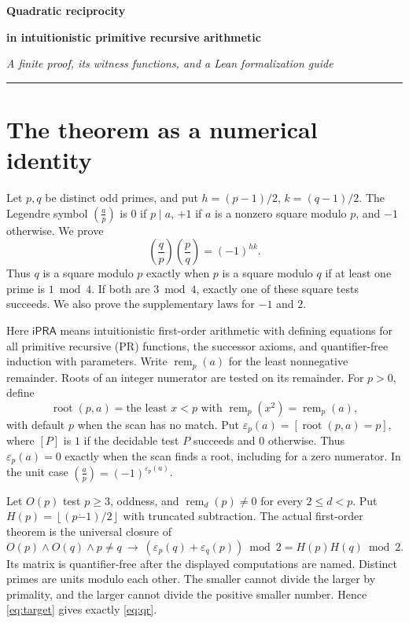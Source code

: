 \documentclass[12pt,letterpaper]{article}
\newcommand{\sect}[1]{\section{\texorpdfstring{\color{accent}#1}{#1}}}
\newcommand{\leg}[2]{\left(\frac{#1}{#2}\right)}
\newcommand{\floor}[1]{\left\lfloor#1\right\rfloor}
\newcommand{\remn}{\operatorname{rem}}
\newcommand{\rootf}{\operatorname{root}}
\newcommand{\sgnbit}{\varepsilon}
\newcommand{\ipra}{\mathsf{iPRA}}
\begin{document}
\thispagestyle{plain}
{\Huge\bfseries\sffamily\color{accent}Quadratic reciprocity}\par
{\LARGE\bfseries in intuitionistic primitive recursive arithmetic}\par
\vspace{3pt}
\textit{A finite proof, its witness functions, and a Lean formalization guide}
\par\vspace{3pt}\hrule\vspace{4pt}
\sect{The theorem as a numerical identity}\label{sec:statement}
Let $p,q$ be distinct odd primes, and put $h=(p-1)/2$, $k=(q-1)/2$. The Legendre symbol $\leg{a}{p}$ is $0$ if $p\mid a$, $+1$ if $a$ is a nonzero square modulo $p$, and $-1$ otherwise. We prove
\begin{equation}\label{eq:qr}
  \boxed{\displaystyle \leg{q}{p}\leg{p}{q}=(-1)^{hk}.}
\end{equation}
Thus $q$ is a square modulo $p$ exactly when $p$ is a square modulo $q$ if at least one prime is $1\bmod 4$. If both are $3\bmod4$, exactly one of these square tests succeeds. We also prove the supplementary laws for $-1$ and $2$.

Here $\ipra$ means intuitionistic first-order arithmetic with defining equations for all primitive recursive (PR) functions, the successor axioms, and quantifier-free induction with parameters. Write $\remn_p(a)$ for the least nonnegative remainder. Roots of an integer numerator are tested on its remainder. For $p>0$, define
\[
 \rootf(p,a)=\text{the least }x<p\text{ with }\remn_p(x^2)=\remn_p(a),
\]
with default $p$ when the scan has no match. Put $\sgnbit_p(a)=[\rootf(p,a)=p]$, where $[P]$ is $1$ if the decidable test $P$ succeeds and $0$ otherwise. Thus $\sgnbit_p(a)=0$ exactly when the scan finds a root, including for a zero numerator. In the unit case $\leg{a}{p}=(-1)^{\sgnbit_p(a)}$.

Let $O(p)$ test $p\ge3$, oddness, and $\remn_d(p)\ne0$ for every $2\le d<p$. Put $H(p)=\floor{(p\mathbin{\dot-}1)/2}$ with truncated subtraction. The actual first-order theorem is the universal closure of
\begin{equation}\label{eq:target}
 O(p)\land O(q)\land p\ne q\ \longrightarrow\ 
 (\sgnbit_p(q)+\sgnbit_q(p))\bmod 2=H(p)H(q)\bmod 2.
\end{equation}
Its matrix is quantifier-free after the displayed computations are named. Distinct primes are units modulo each other. The smaller cannot divide the larger by primality, and the larger cannot divide the positive smaller number. Hence \eqref{eq:target} gives exactly \eqref{eq:qr}.
\end{document}
